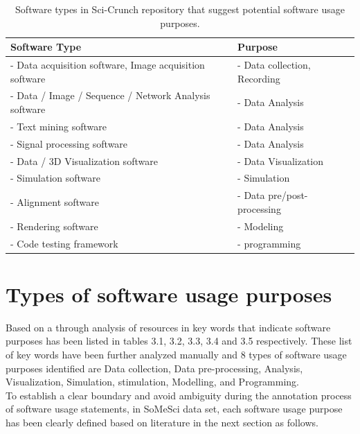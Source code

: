 \begin{table}[h!]
	\begin{center}
		\caption{Software types in Sci-Crunch repository that suggest potential software usage purposes.}
		\label{tab:table1}
		\begin{tabular}{|l|l|} %
			\hline
			\textbf{Software Type} & \textbf{Purpose} \\
			\hline
			- Data acquisition software, Image acquisition software  & - Data collection, Recording  \\
			\hline
			- Data / Image  / Sequence  / Network  Analysis software  & - Data Analysis  \\
			\hline
			- Text mining software  & - Data Analysis  \\
			\hline
			- Signal processing software  & - Data Analysis  \\
			\hline
			- Data / 3D Visualization software & - Data Visualization  \\
			\hline
			- Simulation software  & - Simulation  \\
			\hline
			- Alignment software  & - Data pre/post-processing \\
			\hline
			- Rendering software  & - Modeling  \\
			\hline
			-	Code testing framework   & - programming  \\
			\hline
		\end{tabular}
	\end{center}
\end{table}


\section{Types of software usage purposes }
\label{sec:purpose:Types}

Based on a through analysis of resources in key words that indicate software purposes has been listed in tables 3.1, 3.2, 3.3, 3.4 and 3.5 respectively. These list of key words have been further analyzed manually and 8 types of software usage purposes identified are Data collection,  Data pre-processing, Analysis, Visualization, Simulation, stimulation, Modelling, and Programming. \\

To establish a clear boundary and avoid ambiguity during the annotation process of software usage statements, in \ac{SoMeSci} data set, each software usage purpose has been clearly defined based on literature in the next section as follows. 


